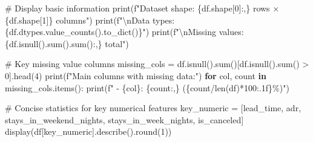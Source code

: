\documentclass[
  letterpaper,
  DIV=11,
  numbers=noendperiod]{scrartcl}
\newenvironment{Shaded}{\begin{snugshade}}{\end{snugshade}}
\newcommand{\BuiltInTok}[1]{\textcolor[rgb]{0.00,0.23,0.31}{#1}}
\newcommand{\CharTok}[1]{\textcolor[rgb]{0.13,0.47,0.30}{#1}}
\newcommand{\CommentTok}[1]{\textcolor[rgb]{0.37,0.37,0.37}{#1}}
\newcommand{\ControlFlowTok}[1]{\textcolor[rgb]{0.00,0.23,0.31}{\textbf{#1}}}
\newcommand{\DecValTok}[1]{\textcolor[rgb]{0.68,0.00,0.00}{#1}}
\newcommand{\KeywordTok}[1]{\textcolor[rgb]{0.00,0.23,0.31}{\textbf{#1}}}
\newcommand{\NormalTok}[1]{\textcolor[rgb]{0.00,0.23,0.31}{#1}}
\newcommand{\OperatorTok}[1]{\textcolor[rgb]{0.37,0.37,0.37}{#1}}
\newcommand{\SpecialCharTok}[1]{\textcolor[rgb]{0.37,0.37,0.37}{#1}}
\newcommand{\SpecialStringTok}[1]{\textcolor[rgb]{0.13,0.47,0.30}{#1}}
\newcommand{\StringTok}[1]{\textcolor[rgb]{0.13,0.47,0.30}{#1}}
\renewenvironment{Shaded}{%
  \begin{tcolorbox}[%
    enhanced,%
    colback=codebg,%
    colframe=codebg,%
    borderline west={3pt}{0pt}{sectionblue},%
    fontupper=\small\ttfamily,%
    boxrule=0pt,%
    arc=0pt,%
    boxsep=5pt,%
    left=2mm,%
    right=2mm,%
    top=2mm,%
    bottom=2mm%
  ]%
}{%
  \end{tcolorbox}%
}
\begin{document}
\begin{Shaded}
\begin{Highlighting}[]
\CommentTok{\# Display basic information}
\BuiltInTok{print}\NormalTok{(}\SpecialStringTok{f"Dataset shape: }\SpecialCharTok{\{}\NormalTok{df}\SpecialCharTok{.}\NormalTok{shape[}\DecValTok{0}\NormalTok{]}\SpecialCharTok{:,\}}\SpecialStringTok{ rows × }\SpecialCharTok{\{}\NormalTok{df}\SpecialCharTok{.}\NormalTok{shape[}\DecValTok{1}\NormalTok{]}\SpecialCharTok{\}}\SpecialStringTok{ columns"}\NormalTok{)}
\BuiltInTok{print}\NormalTok{(}\SpecialStringTok{f"}\CharTok{\textbackslash{}n}\SpecialStringTok{Data types: }\SpecialCharTok{\{}\NormalTok{df}\SpecialCharTok{.}\NormalTok{dtypes}\SpecialCharTok{.}\NormalTok{value\_counts()}\SpecialCharTok{.}\NormalTok{to\_dict()}\SpecialCharTok{\}}\SpecialStringTok{"}\NormalTok{)}
\BuiltInTok{print}\NormalTok{(}\SpecialStringTok{f"}\CharTok{\textbackslash{}n}\SpecialStringTok{Missing values: }\SpecialCharTok{\{}\NormalTok{df}\SpecialCharTok{.}\NormalTok{isnull()}\SpecialCharTok{.}\BuiltInTok{sum}\NormalTok{()}\SpecialCharTok{.}\BuiltInTok{sum}\NormalTok{()}\SpecialCharTok{:,\}}\SpecialStringTok{ total"}\NormalTok{)}

\CommentTok{\# Key missing value columns}
\NormalTok{missing\_cols }\OperatorTok{=}\NormalTok{ df.isnull().}\BuiltInTok{sum}\NormalTok{()[df.isnull().}\BuiltInTok{sum}\NormalTok{() }\OperatorTok{\textgreater{}} \DecValTok{0}\NormalTok{].head(}\DecValTok{4}\NormalTok{)}
\BuiltInTok{print}\NormalTok{(}\SpecialStringTok{f"Main columns with missing data:"}\NormalTok{)}
\ControlFlowTok{for}\NormalTok{ col, count }\KeywordTok{in}\NormalTok{ missing\_cols.items():}
    \BuiltInTok{print}\NormalTok{(}\SpecialStringTok{f"  {-} }\SpecialCharTok{\{}\NormalTok{col}\SpecialCharTok{\}}\SpecialStringTok{: }\SpecialCharTok{\{}\NormalTok{count}\SpecialCharTok{:,\}}\SpecialStringTok{ (}\SpecialCharTok{\{}\NormalTok{count}\OperatorTok{/}\BuiltInTok{len}\NormalTok{(df)}\OperatorTok{*}\DecValTok{100}\SpecialCharTok{:.1f\}}\SpecialStringTok{\%)"}\NormalTok{)}

\CommentTok{\# Concise statistics for key numerical features}
\NormalTok{key\_numeric }\OperatorTok{=}\NormalTok{ [}\StringTok{\textquotesingle{}lead\_time\textquotesingle{}}\NormalTok{, }\StringTok{\textquotesingle{}adr\textquotesingle{}}\NormalTok{, }\StringTok{\textquotesingle{}stays\_in\_weekend\_nights\textquotesingle{}}\NormalTok{, }
               \StringTok{\textquotesingle{}stays\_in\_week\_nights\textquotesingle{}}\NormalTok{, }\StringTok{\textquotesingle{}is\_canceled\textquotesingle{}}\NormalTok{]}
\NormalTok{display(df[key\_numeric].describe().}\BuiltInTok{round}\NormalTok{(}\DecValTok{1}\NormalTok{))}


\end{Highlighting}
\end{Shaded}
\end{document}
